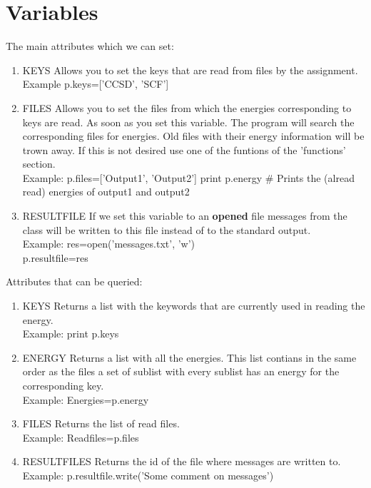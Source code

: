 \documentclass[a4paper, fleqn]{article}
\begin{document}
\section{Variables}
The main attributes which we can set:
\begin{enumerate}
\item{KEYS} Allows you to set the keys that are read from files by the assignment. \\
Example p.keys=['CCSD', 'SCF']
\item{FILES} Allows you to set the files from which the energies corresponding to keys are read. 
As soon as you set this variable. The program will search the corresponding files for energies. Old files with their energy information will be trown away. If this is not desired use one of the funtions of the 'functions' section. \\
Example: p.files=['Output1', 'Output2']
print p.energy \# Prints the (alread read) energies of output1 and output2
\item{RESULTFILE} If we set this variable to an \textbf{opened} file messages from the class will be written to this file instead of to the standard output. \\
Example: res=open('messages.txt', 'w') \\
p.resultfile=res
\end{enumerate}
Attributes that can be queried:
\begin{enumerate}
\item{KEYS} Returns a list with the keywords that are currently used in reading the energy. \\
Example: print p.keys
\item{ENERGY} Returns a list with all the energies. This list contians in the same order as the files a set of sublist with every sublist has an energy for the corresponding key. \\
Example: Energies=p.energy
\item{FILES} Returns the list of read files. \\
Example: Readfiles=p.files
\item{RESULTFILES} Returns the id of the file where messages are written to. \\
Example:
p.resultfile.write('Some comment on messages')
\end{enumerate}
\end{document}
